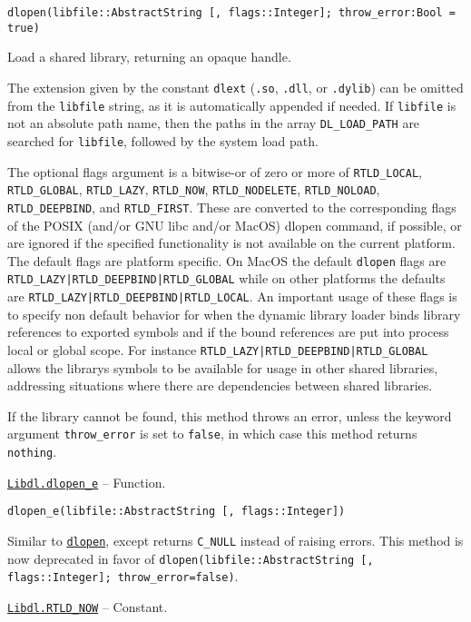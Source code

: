 \begin{adjustwidth}{2em}{0pt}


\begin{verbatim}
dlopen(libfile::AbstractString [, flags::Integer]; throw_error:Bool = true)
\end{verbatim}

Load a shared library, returning an opaque handle.

The extension given by the constant \texttt{dlext} (\texttt{.so}, \texttt{.dll}, or \texttt{.dylib}) can be omitted from the \texttt{libfile} string, as it is automatically appended if needed.   If \texttt{libfile} is not an absolute path name, then the paths in the array \texttt{DL\_LOAD\_PATH} are searched for \texttt{libfile}, followed by the system load path.

The optional flags argument is a bitwise-or of zero or more of \texttt{RTLD\_LOCAL}, \texttt{RTLD\_GLOBAL}, \texttt{RTLD\_LAZY}, \texttt{RTLD\_NOW}, \texttt{RTLD\_NODELETE}, \texttt{RTLD\_NOLOAD}, \texttt{RTLD\_DEEPBIND}, and \texttt{RTLD\_FIRST}. These are converted to the corresponding flags of the POSIX (and/or GNU libc and/or MacOS) dlopen command, if possible, or are ignored if the specified functionality is not available on the current platform. The default flags are platform specific. On MacOS the default \texttt{dlopen} flags are \texttt{RTLD\_LAZY|RTLD\_DEEPBIND|RTLD\_GLOBAL} while on other platforms the defaults are \texttt{RTLD\_LAZY|RTLD\_DEEPBIND|RTLD\_LOCAL}. An important usage of these flags is to specify non default behavior for when the dynamic library loader binds library references to exported symbols and if the bound references are put into process local or global scope. For instance \texttt{RTLD\_LAZY|RTLD\_DEEPBIND|RTLD\_GLOBAL} allows the library{\textquotesingle}s symbols to be available for usage in other shared libraries, addressing situations where there are dependencies between shared libraries.

If the library cannot be found, this method throws an error, unless the keyword argument \texttt{throw\_error} is set to \texttt{false}, in which case this method returns \texttt{nothing}.



\end{adjustwidth}
\hypertarget{10728988161738445989}{} 
\hyperlink{10728988161738445989}{\texttt{Libdl.dlopen\_e}}  -- {Function.}

\begin{adjustwidth}{2em}{0pt}


\begin{verbatim}
dlopen_e(libfile::AbstractString [, flags::Integer])
\end{verbatim}

Similar to \hyperlink{8171750449393676854}{\texttt{dlopen}}, except returns \texttt{C\_NULL} instead of raising errors. This method is now deprecated in favor of \texttt{dlopen(libfile::AbstractString [, flags::Integer]; throw\_error=false)}.



\end{adjustwidth}
\hypertarget{8137158678557353815}{} 
\hyperlink{8137158678557353815}{\texttt{Libdl.RTLD\_NOW}}  -- {Constant.}

